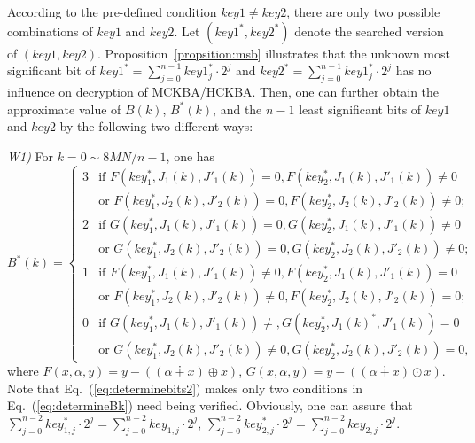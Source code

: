\documentclass{ws-ijbc}
\begin{document}
According to the pre-defined condition $key1\neq key2$, there are only two possible combinations of $key1$ and $key2$.  Let $(key1^*, key2^*)$ denote the searched version of $(key1, key2)$. Proposition~\ref{propsition:msb} illustrates that the unknown most significant bit of $key1^*=\sum_{j=0}^{n-1}key1^*_j\cdot 2^j$ and $key2^*=\sum_{j=0}^{n-1}key1_j^*\cdot 2^j$ has no influence on decryption of MCKBA/HCKBA. Then, one can further obtain the approximate value of $B(k)$, $B^*(k)$, and the $n-1$ least significant bits of
$key1$ and $key2$ by the following two different ways:
\begin{itemlist}
\item  \textit{W1)} For $k=0\sim 8MN/n-1$, one has
\begin{equation}
B^*(k)=
\begin{cases}
3  & \mbox{if } F(key_1^*, J_1(k), J'_1(k))=0, F(key_2^*, J_1(k), J'_1(k))\neq 0\\
   &  \mbox{or } F(key_1^*, J_2(k), J'_2(k))=0, F(key_2^*, J_2(k), J'_2(k))\neq 0;\\
2  & \mbox{if } G(key_1^*, J_1(k), J'_1(k))=0, G(key_2^*, J_1(k), J'_1(k))\neq0\\
   &  \mbox{or } G(key_1^*, J_2(k), J'_2(k))=0, G(key_2^*, J_2(k), J'_2(k))\neq0;\\
1  & \mbox{if } F(key_1^*, J_1(k), J'_1(k))\neq0, F(key_2^*, J_1(k), J'_1(k))=0\\
   &  \mbox{or } F(key_1^*, J_2(k), J'_2(k))\neq0, F(key_2^*, J_2(k), J'_2(k))= 0;\\
0  & \mbox{if } G(key_1^*, J_1(k), J'_1(k))\neq, G(key_2^*, J_1(k)^*, J'_1(k))=0\\
   &  \mbox{or } G(key_1^*, J_2(k), J'_2(k))\neq0, G(key_2^*, J_2(k), J'_2(k))=0,
\end{cases}
\label{eq:determineBk}
\end{equation}
where $F(x, \alpha, y)=y-((\alpha\dotplus x)\oplus x)$, $G(x, \alpha, y)=y-((\alpha\dotplus x)\odot x)$. Note that
Eq.~(\ref{eq:determinebits2}) makes only two conditions in Eq.~(\ref{eq:determineBk}) need being
verified. Obviously, one can assure that $\sum_{j=0}^{n-2}key^*_{1,j}\cdot 2^j=\sum_{j=0}^{n-2}key_{1,j}\cdot 2^j$, $\sum_{j=0}^{n-2}key^*_{2,j}\cdot 2^j=\sum_{j=0}^{n-2}key_{2,j}\cdot 2^j$.



\end{itemlist}
\end{document}
